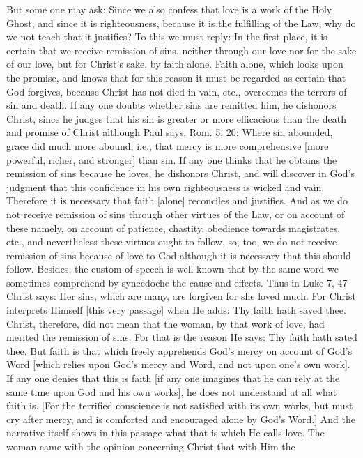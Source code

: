 But some one may ask: Since we also confess that love is a work of
the Holy Ghost, and since it is righteousness, because it is the
fulfilling of the Law, why do we not teach that it justifies?  To
this we must reply: In the first place, it is certain that we receive
remission of sins, neither through our love nor for the sake of our
love, but for Christ's sake, by faith alone.  Faith alone, which
looks upon the promise, and knows that for this reason it must be
regarded as certain that God forgives, because Christ has not died in
vain, etc., overcomes the terrors of sin and death.  If any one
doubts whether sins are remitted him, he dishonors Christ, since he
judges that his sin is greater or more efficacious than the death and
promise of Christ although Paul says, Rom. 5, 20: Where sin abounded,
grace did much more abound, i.e., that mercy is more comprehensive
[more powerful, richer, and stronger] than sin.  If any one thinks
that he obtains the remission of sins because he loves, he dishonors
Christ, and will discover in God's judgment that this confidence in
his own righteousness is wicked and vain.  Therefore it is necessary
that faith [alone] reconciles and justifies.  And as we do not
receive remission of sins through other virtues of the Law, or on
account of these namely, on account of patience, chastity, obedience
towards magistrates, etc., and nevertheless these virtues ought to
follow, so, too, we do not receive remission of sins because of love
to God although it is necessary that this should follow.  Besides,
the custom of speech is well known that by the same word we sometimes
comprehend by synecdoche the cause and effects.  Thus in Luke 7, 47
Christ says: Her sins, which are many, are forgiven for she loved
much.  For Christ interprets Himself [this very passage] when He adds:
Thy faith hath saved thee.  Christ, therefore, did not mean that the
woman, by that work of love, had merited the remission of sins.  For
that is the reason He says: Thy faith hath sated thee.  But faith is
that which freely apprehends God's mercy on account of God's Word
[which relies upon God's mercy and Word, and not upon one's own work].
If any one denies that this is faith [if any one imagines that he
can rely at the same time upon God and his own works], he does not
understand at all what faith is.  [For the terrified conscience is
not satisfied with its own works, but must cry after mercy, and is
comforted and encouraged alone by God's Word.] And the narrative
itself shows in this passage what that is which He calls love.  The
woman came with the opinion concerning Christ that with Him the
